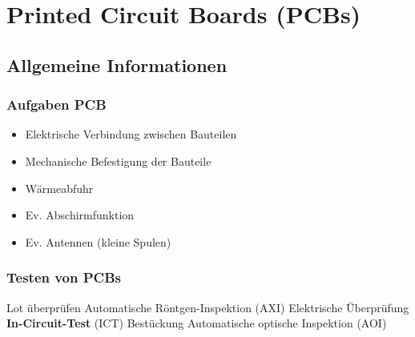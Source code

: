 \section{Printed Circuit Boards (PCBs)}


\subsection{Allgemeine Informationen}

\begin{minipage}[t]{0.42\columnwidth}
    \subsubsection{Aufgaben PCB}

    \raggedright%
     \begin{itemize}
        \item Elektrische Verbindung zwischen Bauteilen
        \item Mechanische Befestigung der Bauteile
        \item Wärmeabfuhr
        \item Ev. Abschirmfunktion
        \item Ev. Antennen (kleine Spulen)
     \end{itemize}
\end{minipage}
\hfill
\begin{minipage}[t]{0.56\columnwidth}
    \subsubsection{Testen von PCBs}

    \begin{outline}
        \1 Lot überprüfen
            \2 Automatische Röntgen-Inspektion (AXI)
        \1 Elektrische Überprüfung
            \2 \textbf{In-Circuit-Test} (ICT)
        \1 Bestückung
            \2 Automatische optische Inspektion (AOI)
    \end{outline}
\end{minipage}


